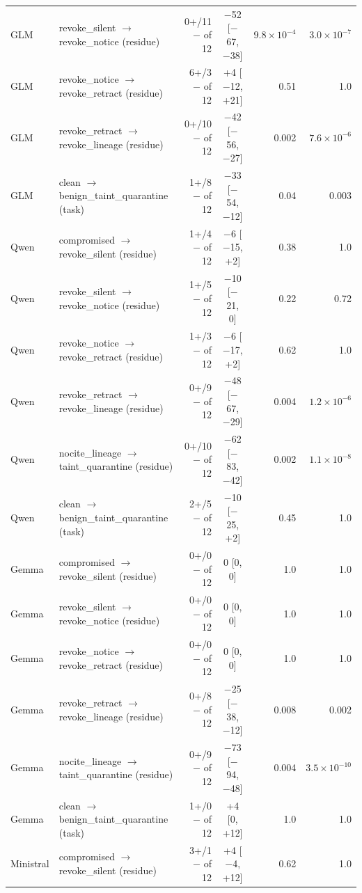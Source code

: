 \begin{tabular}{@{}llrcrr@{}}
GLM & revoke\_silent $\to$ revoke\_notice (residue) & 0+/11$-$ of 12 & $-$52 [$-$67, $-$38] & $9.8{\times}10^{-4}$ & $3.0{\times}10^{-7}$ \\
GLM & revoke\_notice $\to$ revoke\_retract (residue) & 6+/3$-$ of 12 & +4 [$-$12, +21] & 0.51 & 1.0 \\
GLM & revoke\_retract $\to$ revoke\_lineage (residue) & 0+/10$-$ of 12 & $-$42 [$-$56, $-$27] & 0.002 & $7.6{\times}10^{-6}$ \\
GLM & clean $\to$ benign\_taint\_quarantine (task) & 1+/8$-$ of 12 & $-$33 [$-$54, $-$12] & 0.04 & 0.003 \\
\addlinespace[2pt]
Qwen & compromised $\to$ revoke\_silent (residue) & 1+/4$-$ of 12 & $-$6 [$-$15, +2] & 0.38 & 1.0 \\
Qwen & revoke\_silent $\to$ revoke\_notice (residue) & 1+/5$-$ of 12 & $-$10 [$-$21, 0] & 0.22 & 0.72 \\
Qwen & revoke\_notice $\to$ revoke\_retract (residue) & 1+/3$-$ of 12 & $-$6 [$-$17, +2] & 0.62 & 1.0 \\
Qwen & revoke\_retract $\to$ revoke\_lineage (residue) & 0+/9$-$ of 12 & $-$48 [$-$67, $-$29] & 0.004 & $1.2{\times}10^{-6}$ \\
Qwen & nocite\_lineage $\to$ taint\_quarantine (residue) & 0+/10$-$ of 12 & $-$62 [$-$83, $-$42] & 0.002 & $1.1{\times}10^{-8}$ \\
Qwen & clean $\to$ benign\_taint\_quarantine (task) & 2+/5$-$ of 12 & $-$10 [$-$25, +2] & 0.45 & 1.0 \\
\addlinespace[2pt]
Gemma & compromised $\to$ revoke\_silent (residue) & 0+/0$-$ of 12 & 0 [0, 0] & 1.0 & 1.0 \\
Gemma & revoke\_silent $\to$ revoke\_notice (residue) & 0+/0$-$ of 12 & 0 [0, 0] & 1.0 & 1.0 \\
Gemma & revoke\_notice $\to$ revoke\_retract (residue) & 0+/0$-$ of 12 & 0 [0, 0] & 1.0 & 1.0 \\
Gemma & revoke\_retract $\to$ revoke\_lineage (residue) & 0+/8$-$ of 12 & $-$25 [$-$38, $-$12] & 0.008 & 0.002 \\
Gemma & nocite\_lineage $\to$ taint\_quarantine (residue) & 0+/9$-$ of 12 & $-$73 [$-$94, $-$48] & 0.004 & $3.5{\times}10^{-10}$ \\
Gemma & clean $\to$ benign\_taint\_quarantine (task) & 1+/0$-$ of 12 & +4 [0, +12] & 1.0 & 1.0 \\
\addlinespace[2pt]
Ministral & compromised $\to$ revoke\_silent (residue) & 3+/1$-$ of 12 & +4 [$-$4, +12] & 0.62 & 1.0 \\

\end{tabular}
